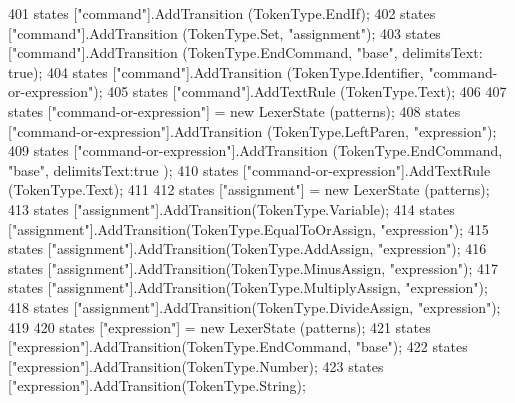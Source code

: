 \begin{DoxyCode}
{401             states [\textcolor{stringliteral}{"command"}].AddTransition (TokenType.EndIf);
402             states [\textcolor{stringliteral}{"command"}].AddTransition (TokenType.Set, \textcolor{stringliteral}{"assignment"});
403             states [\textcolor{stringliteral}{"command"}].AddTransition (TokenType.EndCommand,  \textcolor{stringliteral}{"base"}, delimitsText: \textcolor{keyword}{true});
404             states [\textcolor{stringliteral}{"command"}].AddTransition (TokenType.Identifier, \textcolor{stringliteral}{"command-or-expression"});
405             states [\textcolor{stringliteral}{"command"}].AddTextRule (TokenType.Text);
406 
407             states [\textcolor{stringliteral}{"command-or-expression"}] = \textcolor{keyword}{new} LexerState (patterns);
408             states [\textcolor{stringliteral}{"command-or-expression"}].AddTransition (TokenType.LeftParen, \textcolor{stringliteral}{"expression"});
409             states [\textcolor{stringliteral}{"command-or-expression"}].AddTransition (TokenType.EndCommand, \textcolor{stringliteral}{"base"}, delimitsText:\textcolor{keyword}{true}
      );
410             states [\textcolor{stringliteral}{"command-or-expression"}].AddTextRule (TokenType.Text);
411 
412             states [\textcolor{stringliteral}{"assignment"}] = \textcolor{keyword}{new} LexerState (patterns);
413             states [\textcolor{stringliteral}{"assignment"}].AddTransition(TokenType.Variable);
414             states [\textcolor{stringliteral}{"assignment"}].AddTransition(TokenType.EqualToOrAssign, \textcolor{stringliteral}{"expression"});
415             states [\textcolor{stringliteral}{"assignment"}].AddTransition(TokenType.AddAssign, \textcolor{stringliteral}{"expression"});
416             states [\textcolor{stringliteral}{"assignment"}].AddTransition(TokenType.MinusAssign, \textcolor{stringliteral}{"expression"});
417             states [\textcolor{stringliteral}{"assignment"}].AddTransition(TokenType.MultiplyAssign, \textcolor{stringliteral}{"expression"});
418             states [\textcolor{stringliteral}{"assignment"}].AddTransition(TokenType.DivideAssign, \textcolor{stringliteral}{"expression"});
419 
420             states [\textcolor{stringliteral}{"expression"}] = \textcolor{keyword}{new} LexerState (patterns);
421             states [\textcolor{stringliteral}{"expression"}].AddTransition(TokenType.EndCommand, \textcolor{stringliteral}{"base"});
422             states [\textcolor{stringliteral}{"expression"}].AddTransition(TokenType.Number);
423             states [\textcolor{stringliteral}{"expression"}].AddTransition(TokenType.String);
}
\end{DoxyCode}
